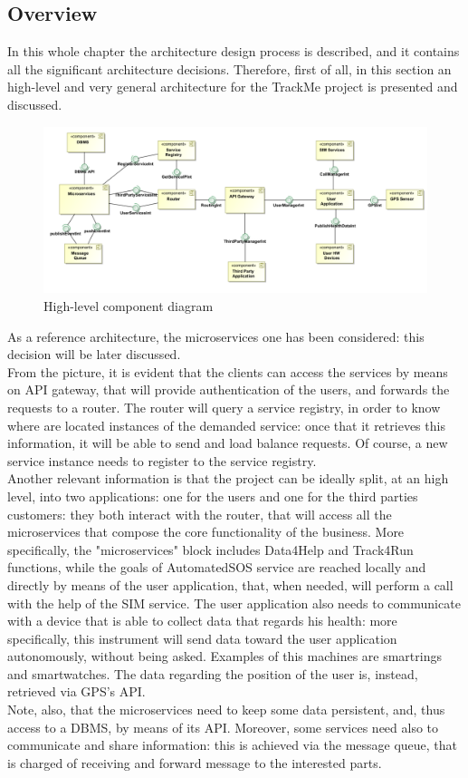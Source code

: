 \subsection{Overview}
In this whole chapter the architecture design process is described, and it contains all the significant
architecture decisions. 
Therefore, first of all, in this section an high-level and very general architecture for the TrackMe 
project is presented and discussed.  

\begin{figure}[H]
\includegraphics[width=\linewidth]{Images/highlevelcd.pdf}
\caption{ High-level component diagram }
\label{fig:highlevelcomponentdiagram}
\end{figure}

As a reference architecture, the microservices one has been considered: this decision will be later discussed. \\
From the picture, it is evident that the clients can access the services by means on API gateway, that will provide authentication 
of the users, and forwards the requests to a router. The router will query a service registry, in order to know where are located instances 
of the demanded service: once that it retrieves this information, it will be able to send and load balance requests.
Of course, a new service instance needs to register to the service registry. \\
Another relevant information is that the project can be ideally split, at an high level, into two applications: one for the users and one for the third parties customers: they both interact with the router, that will access all the
microservices that compose the core functionality of the business.
More specifically, the "microservices" block includes Data4Help and Track4Run functions, while the goals
of AutomatedSOS service are reached locally and directly by means of the user application, that, when
needed, will perform a call with the help of the SIM service. The user application also needs to
communicate with a device that is able to collect data that regards his health: more specifically, this
instrument will send data toward the user application autonomously, without being asked. Examples of 
this machines are smartrings and smartwatches. The data regarding the position of the user is, instead, retrieved via GPS's API. \\
Note, also, that the microservices need to keep some data persistent, and, thus access to a DBMS, by means
of its API. Moreover, some services need also to communicate and share information: this is achieved via the message queue, that is
charged of receiving and forward message to the interested parts. \\


